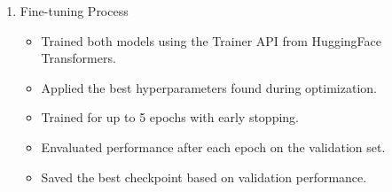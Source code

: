 \documentclass[titlepage]{article}
\begin{document}
\begin{enumerate}
\begin{itemize}
        \end{itemize}
    \item Fine-tuning Process 
        \begin{itemize}
            \item Trained both models using the Trainer API from HuggingFace Transformers.
            \item Applied the best hyperparameters found during optimization.
            \item Trained for up to 5 epochs with early stopping.
            \item Envaluated performance after each epoch on the validation set.
            \item Saved the best checkpoint based on validation performance.
        \end{itemize}
\end{enumerate}
\end{document}
